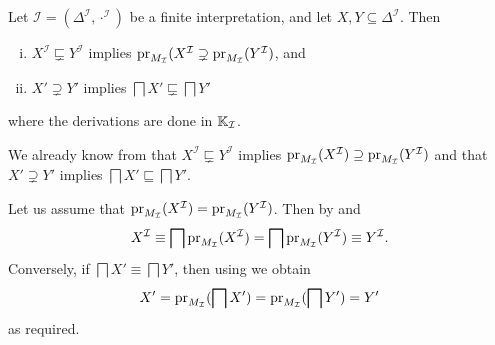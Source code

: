 \begin{Proposition}
  \label{prop:non-equivalence-implies-non-equality-and-vv}
  Let $\mathcal{I} = (\Delta^{\mathcal{I}}, \cdot^{\mathcal{I}})$ be a finite
  interpretation, and let $X, Y \subseteq \Delta^{\mathcal{I}}$.  Then
  \begin{enumerate}[i. ]
  \item $X^{\mathcal{I}} \sqsubsetneq Y^{\mathcal{I}}$ implies
    $\operatorname{pr}_{M_{\mathcal{I}}}(X^{\mathcal{I}} \supsetneq
    \operatorname{pr}_{M_{\mathcal{I}}}(Y^{\mathcal{I}})$, and
  \item $X' \supsetneq Y'$ implies $\bigsqcap X' \sqsubsetneq \bigsqcap Y'$
  \end{enumerate}
  where the derivations are done in ${\mathbb{K}}_{\mathcal{I}}$.
\end{Proposition}
\begin{Proof}
  We already know from  that $X^{\mathcal{I}} \sqsubsetneq
  Y^{\mathcal{I}}$ implies $\operatorname{pr}_{M_{\mathcal{I}}}(X^{\mathcal{I}}) \supseteq
  \operatorname{pr}_{M_{\mathcal{I}}}(Y^{\mathcal{I}})$ and that $X' \supsetneq Y'$ implies $\bigsqcap
  X' \sqsubseteq \bigsqcap Y'$.

  Let us assume that $\operatorname{pr}_{M_{\mathcal{I}}}(X^{\mathcal{I}}) =
  \operatorname{pr}_{M_{\mathcal{I}}}(Y^{\mathcal{I}})$.  Then by
   and
  \begin{equation*}
    X^{\mathcal{I}} \equiv \bigsqcap \operatorname{pr}_{M_{\mathcal{I}}}(X^{\mathcal{I}}) = \bigsqcap
    \operatorname{pr}_{M_{\mathcal{I}}}(Y^{\mathcal{I}}) \equiv Y^{\mathcal{I}}.
  \end{equation*}
  Conversely, if $\bigsqcap X' \equiv \bigsqcap Y'$, then using
   we obtain
  \begin{equation*}
    X' = \operatorname{pr}_{M_{\mathcal{I}}}(\bigsqcap X') = \operatorname{pr}_{M_{\mathcal{I}}}(\bigsqcap Y') = Y'
  \end{equation*}
  as required.
\end{Proof}

